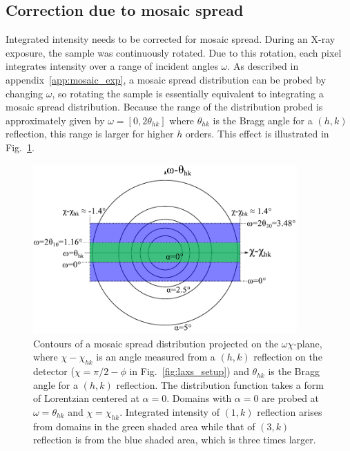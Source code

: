 \subsection{Correction due to mosaic spread}\label{sec:mosaic_spread_correction}
Integrated intensity needs to be corrected for mosaic spread. 
During an X-ray exposure, the sample
was continuously rotated. Due to this rotation, each pixel integrates 
intensity over a range of incident angles $\omega$.
As described in appendix~\ref{app:mosaic_exp}, 
a mosaic spread distribution can be probed
by changing $\omega$, so rotating the sample is essentially  
equivalent to integrating a mosaic spread distribution.
Because the range of the distribution probed is approximately given by $\omega=[0, 2\theta_{hk}]$ 
where $\theta_{hk}$ is the Bragg angle for a $(h,k)$ reflection, 
this range is larger for higher $h$ orders. 
This effect is illustrated in Fig.~\ref{fig:mosaic_contour}.

\begin{figure}[htbp]
  \centering
  \includegraphics[width=0.9\textwidth]{figures/ripple/analysis/mosaic_contour}
  \caption{Contours of a mosaic spread distribution projected on the $\omega\chi$-plane,
  where $\chi-\chi_{hk}$ is an angle measured from a $(h,k)$ reflection on the detector
  ($\chi=\pi/2-\phi$ in Fig.~\ref{fig:laxs_setup}) and $\theta_{hk}$ is the
  Bragg angle for a $(h,k)$ reflection.
  The distribution function takes a form of Lorentzian centered at $\alpha=0$.
  Domains with $\alpha=0$ are probed at $\omega=\theta_{hk}$ and $\chi=\chi_{hk}$.
  Integrated intensity of $(1,k)$ reflection arises from domains in the green
  shaded area while that of $(3,k)$ reflection is from the
  blue shaded area, which is three times larger.}
  \label{fig:mosaic_contour} 
\end{figure}

